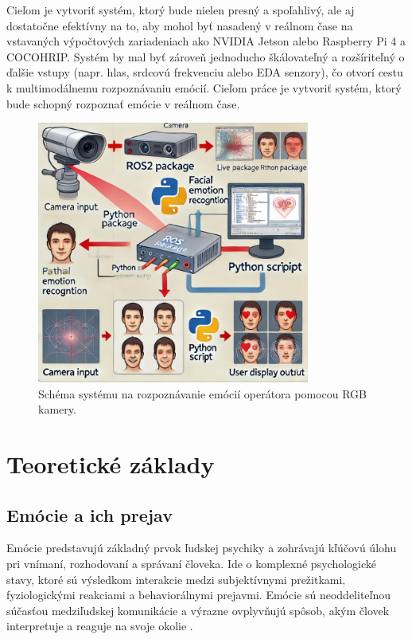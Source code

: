 Cieľom je vytvoriť systém, ktorý bude nielen presný a spoľahlivý, ale aj dostatočne efektívny na to, aby mohol byť nasadený v reálnom čase na vstavaných výpočtových zariadeniach ako 
NVIDIA Jetson alebo Raspberry Pi 4 a COCOHRIP. Systém by mal byť zároveň jednoducho škálovateľný a rozšíriteľný o ďalšie vstupy (napr. hlas, srdcovú frekvenciu alebo EDA senzory), čo otvorí cestu k multimodálnemu rozpoznávaniu emócií.
Cieľom práce je vytvoriť systém, ktorý bude schopný rozpoznať emócie v reálnom čase.\
\begin{figure}[!htpb]
    \centering
    \includegraphics[width=0.8\textwidth]{img/connection.png}
    \caption{Schéma systému na rozpoznávanie emócií operátora pomocou RGB kamery.} 
    \label{fig:schema}
\end{figure}
\section{Teoretické základy}
\label{sec:theory}
\subsection{Emócie a ich prejav}
\label{sec:emotions}
Emócie predstavujú základný prvok ľudskej psychiky a zohrávajú kľúčovú úlohu pri vnímaní, rozhodovaní a správaní človeka. Ide o komplexné psychologické stavy, ktoré sú výsledkom interakcie medzi subjektívnymi prežitkami, 
fyziologickými reakciami a behaviorálnymi prejavmi. 
Emócie sú neoddeliteľnou súčasťou medziľudskej komunikácie a výrazne ovplyvňujú spôsob, akým človek interpretuje a reaguje na svoje okolie \cite{article01}.

